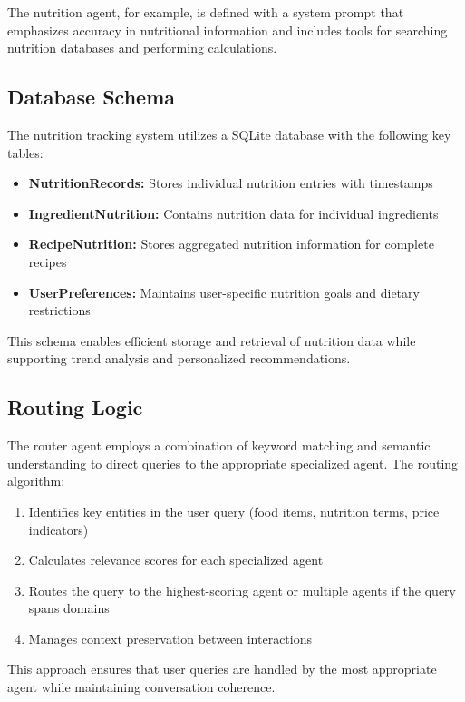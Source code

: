 \documentclass[10pt,twocolumn,letterpaper]{article}
\begin{document}
The nutrition agent, for example, is defined with a system prompt that emphasizes accuracy in nutritional information and includes tools for searching nutrition databases and performing calculations.

\subsection{Database Schema}

The nutrition tracking system utilizes a SQLite database with the following key tables:

\begin{itemize}[noitemsep,topsep=0pt]
    \item \textbf{NutritionRecords:} Stores individual nutrition entries with timestamps
    \item \textbf{IngredientNutrition:} Contains nutrition data for individual ingredients
    \item \textbf{RecipeNutrition:} Stores aggregated nutrition information for complete recipes
    \item \textbf{UserPreferences:} Maintains user-specific nutrition goals and dietary restrictions
\end{itemize}

This schema enables efficient storage and retrieval of nutrition data while supporting trend analysis and personalized recommendations.

\subsection{Routing Logic}

The router agent employs a combination of keyword matching and semantic understanding to direct queries to the appropriate specialized agent. The routing algorithm:

\begin{enumerate}[noitemsep,topsep=0pt]
    \item Identifies key entities in the user query (food items, nutrition terms, price indicators)
    \item Calculates relevance scores for each specialized agent
    \item Routes the query to the highest-scoring agent or multiple agents if the query spans domains
    \item Manages context preservation between interactions
\end{enumerate}

This approach ensures that user queries are handled by the most appropriate agent while maintaining conversation coherence.
\end{document}
